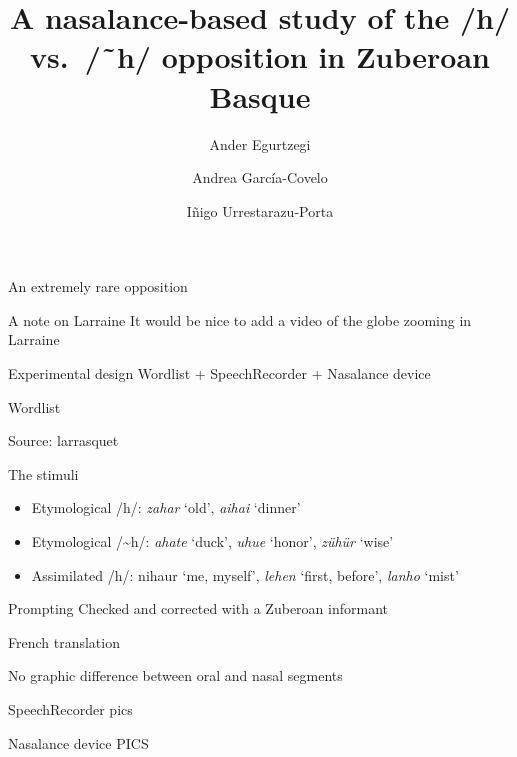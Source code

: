 \documentclass[
  ignorenonframetext,
]{beamer}
\title{A nasalance-based study of the /h/ vs.~/˜h/ opposition in
Zuberoan Basque}
\author{Ander Egurtzegi \and Andrea García-Covelo \and Iñigo
Urrestarazu-Porta}
\date{}
\begin{document}
\frame{\titlepage}

\begin{frame}{An extremely rare opposition}
\protect\hypertarget{an-extremely-rare-opposition}{}
\begin{block}{A note on Larraine}
\protect\hypertarget{a-note-on-larraine}{}
It would be nice to add a video of the globe zooming in Larraine
\end{block}
\end{frame}

\begin{frame}{Experimental design}
\protect\hypertarget{experimental-design}{}
Wordlist + SpeechRecorder + Nasalance device

\begin{block}{Wordlist}
\protect\hypertarget{wordlist}{}
\end{block}

\begin{block}{Source: larrasquet}
\protect\hypertarget{source-larrasquet}{}
\end{block}

\begin{block}{The stimuli}
\protect\hypertarget{the-stimuli}{}
\begin{itemize}
\item
  Etymological /h/: \emph{zahar} `old', \emph{aihai} `dinner'
\item
  Etymological /\textasciitilde h/: \emph{ahate} `duck', \emph{uhue}
  `honor', \emph{zühür} `wise'
\item
  Assimilated /h/: nihaur `me, myself', \emph{lehen} `first, before',
  \emph{lanho} `mist'
\end{itemize}
\end{block}

\begin{block}{Prompting}
\protect\hypertarget{prompting}{}
Checked and corrected with a Zuberoan informant

French translation

No graphic difference between oral and nasal segments

SpeechRecorder pics
\end{block}

\begin{block}{Nasalance device}
\protect\hypertarget{nasalance-device}{}
PICS
\end{block}
\end{frame}
\end{document}
